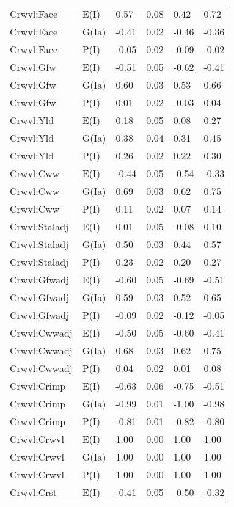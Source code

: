 \begin{center}
\begin{longtable}{|p{1.1in}|p{0.7in}|p{0.7in}|p{0.6in}|p{0.6in}|p{0.6in}|}
  Crwvl:Face & E(I) & 0.57 & 0.08 & 0.42 & 0.72 \\ 
  Crwvl:Face & G(Ia) & -0.41 & 0.02 & -0.46 & -0.36 \\ 
  Crwvl:Face & P(I) & -0.05 & 0.02 & -0.09 & -0.02 \\ 
  Crwvl:Gfw & E(I) & -0.51 & 0.05 & -0.62 & -0.41 \\ 
  Crwvl:Gfw & G(Ia) & 0.60 & 0.03 & 0.53 & 0.66 \\ 
  Crwvl:Gfw & P(I) & 0.01 & 0.02 & -0.03 & 0.04 \\ 
  Crwvl:Yld & E(I) & 0.18 & 0.05 & 0.08 & 0.27 \\ 
  Crwvl:Yld & G(Ia) & 0.38 & 0.04 & 0.31 & 0.45 \\ 
  Crwvl:Yld & P(I) & 0.26 & 0.02 & 0.22 & 0.30 \\ 
  Crwvl:Cww & E(I) & -0.44 & 0.05 & -0.54 & -0.33 \\ 
  Crwvl:Cww & G(Ia) & 0.69 & 0.03 & 0.62 & 0.75 \\ 
  Crwvl:Cww & P(I) & 0.11 & 0.02 & 0.07 & 0.14 \\ 
  Crwvl:Staladj & E(I) & 0.01 & 0.05 & -0.08 & 0.10 \\ 
  Crwvl:Staladj & G(Ia) & 0.50 & 0.03 & 0.44 & 0.57 \\ 
  Crwvl:Staladj & P(I) & 0.23 & 0.02 & 0.20 & 0.27 \\ 
  Crwvl:Gfwadj & E(I) & -0.60 & 0.05 & -0.69 & -0.51 \\ 
  Crwvl:Gfwadj & G(Ia) & 0.59 & 0.03 & 0.52 & 0.65 \\ 
  Crwvl:Gfwadj & P(I) & -0.09 & 0.02 & -0.12 & -0.05 \\ 
  Crwvl:Cwwadj & E(I) & -0.50 & 0.05 & -0.60 & -0.41 \\ 
  Crwvl:Cwwadj & G(Ia) & 0.68 & 0.03 & 0.62 & 0.75 \\ 
  Crwvl:Cwwadj & P(I) & 0.04 & 0.02 & 0.01 & 0.08 \\ 
  Crwvl:Crimp & E(I) & -0.63 & 0.06 & -0.75 & -0.51 \\ 
  Crwvl:Crimp & G(Ia) & -0.99 & 0.01 & -1.00 & -0.98 \\ 
  Crwvl:Crimp & P(I) & -0.81 & 0.01 & -0.82 & -0.80 \\ 
  Crwvl:Crwvl & E(I) & 1.00 & 0.00 & 1.00 & 1.00 \\ 
  Crwvl:Crwvl & G(Ia) & 1.00 & 0.00 & 1.00 & 1.00 \\ 
  Crwvl:Crwvl & P(I) & 1.00 & 0.00 & 1.00 & 1.00 \\ 
  Crwvl:Crst & E(I) & -0.41 & 0.05 & -0.50 & -0.32 \\ 

\end{longtable}
\end{center}
